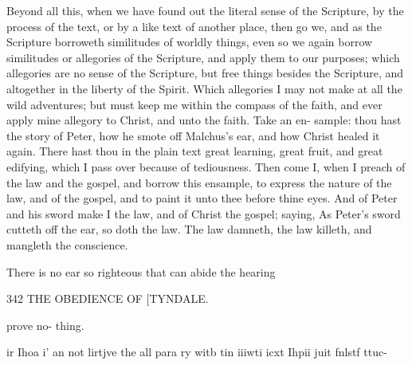 \documentclass{custom}
\begin{document}
{Beyond all this, when we have found out the literal sense 
of the Scripture, by the process of the text, or by a like 
text of another place, then go we, and as the Scripture 
borroweth similitudes of worldly things, even so we again 
borrow similitudes or allegories of the Scripture, and apply 
them to our purposes; which allegories are no sense of
the Scripture, but free things besides the Scripture, and
altogether in the liberty of the Spirit. Which allegories
I may not make at all the wild adventures; but must 
keep me within the compass of the faith, and ever apply 
mine allegory to Christ, and unto the faith. Take an en- 
sample: thou hast the story of Peter, how he smote off 
Malchus's ear, and how Christ healed it again. There 
hast thou in the plain text great learning, great fruit, and 
great edifying, which I pass over because of tediousness. 
Then come I, when I preach of the law and the gospel, 
and borrow this ensample, to express the nature of the 
law, and of the gospel, and to paint it unto thee before 
thine eyes. And of Peter and his sword make I the law, 
and of Christ the gospel; saying, As Peter's sword cutteth 
off the ear, so doth the law. The law damneth, the law 
killeth, and mangleth the conscience. 

There is no ear so righteous that can abide the hearing 


342
THE OBEDIENCE OF
[TYNDALE.

prove no- 
thing. 

ir Ihoa 
i' an not 
lirtjve the 
all para ry 
witb tin 
iiiwti icxt 
Ihpii juit 
fnlstf ttuc- 

}
\end{document}
